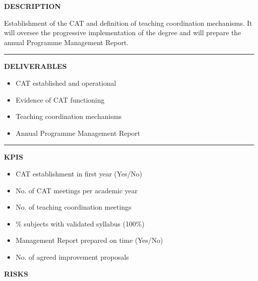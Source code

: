 \documentclass[11pt,a4paper]{scrreprt}
\newcommand{\fieldlabel}[1]{%
  {\footnotesize\sffamily\bfseries\color{mutedcolor}\MakeUppercase{#1}}\par\nopagebreak[4]
}
\newcommand{\fieldsep}{\vspace{3pt}\noindent\textcolor{bordercolor}{\rule{\linewidth}{0.4pt}}\vspace{3pt}\par}
\begin{document}
\begin{tcolorbox}[pabox={aacolor}{A.P.2.1 \enspace\textbullet\enspace Activation of Academic Management for the Degree in Business and Digital Technology}]

\fieldlabel{Description}
{\small Establishment of the CAT and definition of teaching coordination mechanisms. It will oversee the progressive implementation of the degree and will prepare the annual Programme Management Report.}\par
\fieldsep
\fieldlabel{Deliverables}
{\small \begin{itemize}[noitemsep,topsep=2pt]
\item CAT established and operational
\item Evidence of CAT functioning
\item Teaching coordination mechanisms
\item Annual Programme Management Report
\end{itemize}}\par
\fieldsep
\fieldlabel{KPIs}
{\small \begin{itemize}[noitemsep,topsep=2pt]
\item CAT establishment in first year (Yes/No)
\item No. of CAT meetings per academic year
\item No. of teaching coordination meetings
\item \% subjects with validated syllabus (100\%)
\item Management Report prepared on time (Yes/No)
\item No. of agreed improvement proposals
\end{itemize}}\par
\end{tcolorbox}
\begin{tcolorbox}[riskbox]
{\footnotesize\sffamily\bfseries\color{red!50!black} RISKS}\par{}
\end{tcolorbox}
\end{document}
